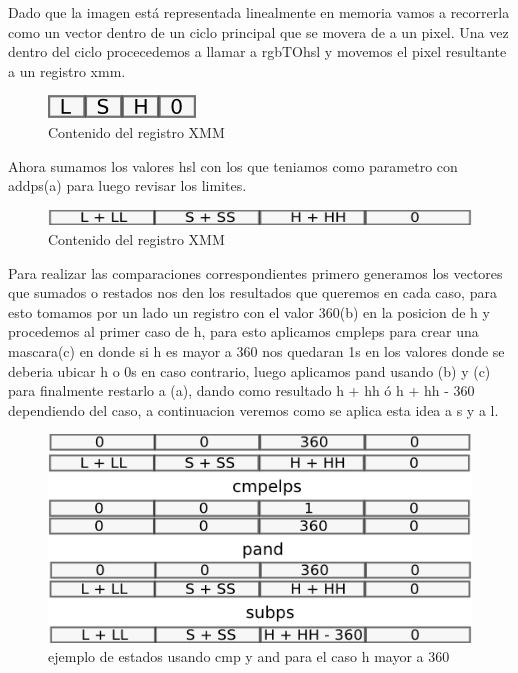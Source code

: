 \documentclass[a4paper]{article}
\begin{document}
Dado que la imagen está representada linealmente en memoria vamos a recorrerla como un vector dentro de un ciclo principal que se movera de a un pixel. Una vez dentro del ciclo procecedemos a llamar a rgbTOhsl y movemos el pixel resultante a un registro xmm.

\begin{figure}[H]
\centering
\includegraphics[scale=0.8]{imagenes/lsh.png}
\caption{Contenido del registro XMM}
\label{lshValue}
\end{figure}

Ahora sumamos los valores hsl con los que teniamos como parametro con addps(a) para luego revisar los limites.

\begin{figure}[H]
\centering
\includegraphics[scale=0.8]{imagenes/sumahsl.png}
\caption{Contenido del registro XMM}
\label{lshValue}
\end{figure}

Para realizar las comparaciones correspondientes primero generamos los vectores que sumados o restados nos den los resultados que queremos en cada caso, para esto tomamos por un lado un registro con el valor 360(b) en la posicion de h y procedemos al primer caso de h, para esto aplicamos cmpleps para crear una mascara(c) en donde si h es mayor a 360 nos quedaran 1s en los valores donde se deberia ubicar h o 0s en caso contrario, luego aplicamos pand usando (b) y (c) para finalmente restarlo a (a), dando como resultado h + hh ó h + hh - 360 dependiendo del caso, a continuacion veremos como se aplica esta idea a s y a l.

\begin{figure}[H]
\centering
\includegraphics[scale=0.8]{imagenes/caso1hsumahsl.png}
\caption{ejemplo de estados usando cmp y and para el caso h mayor a 360}
\label{lshValue}
\end{figure}
\end{document}
